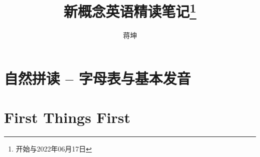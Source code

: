 \documentclass[10pt,UTF8]{ctexbook}
\title{新概念英语精读笔记\footnote{开始与2022年06月17日}}
\author{蒋坤}
\begin{document}
\maketitle




\part{自然拼读 -- 字母表与基本发音}





\part{First Things First}


\end{document}
